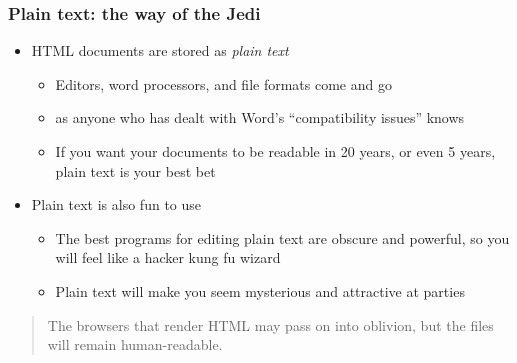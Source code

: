 \documentclass[11pt,ignorenonframetext,]{beamer}
\begin{document}
\begin{frame}\frametitle{Plain text: the way of the Jedi}

\begin{itemize}[<+->]
\itemsep1pt\parskip0pt
\item
  HTML documents are stored as \emph{plain text}

  \begin{itemize}[<+->]
  \itemsep1pt\parskip0pt
  \item
    Editors, word processors, and file formats come and go
  \item
    as anyone who has dealt with Word's ``compatibility issues'' knows
  \item
    If you want your documents to be readable in 20 years, or even 5
    years, plain text is your best bet
  \end{itemize}
\item
  Plain text is also fun to use

  \begin{itemize}[<+->]
  \itemsep1pt\parskip0pt
  \item
    The best programs for editing plain text are obscure and powerful,
    so you will feel like a hacker kung fu wizard
  \item
    Plain text will make you seem mysterious and attractive at parties
  \end{itemize}
\end{itemize}

\begin{quote}
The browsers that render HTML may pass on into oblivion, but the files
will remain human-readable.
\end{quote}

\end{frame}
\end{document}
